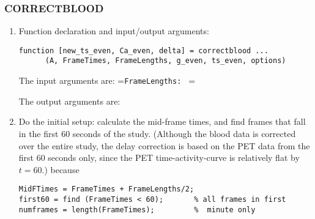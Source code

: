 \subsubsection{CORRECTBLOOD}
\label{sec:correctblood_listing}

\begin{enumerate}

\item Function declaration and input/output arguments:
  \begin{verbatim}
function [new_ts_even, Ca_even, delta] = correctblood ...
      (A, FrameTimes, FrameLengths, g_even, ts_even, options)
  \end{verbatim}
The input arguments are:
%
\newbox\holder
\setbox\holder=\hbox{\tt FrameLengths: }
=\wd\holder
%
The output arguments are:


\item Do the initial setup: calculate the mid-frame times, and find
  frames that fall in the first 60 seconds of the study.  (Although
  the blood data is corrected over the entire study, the delay
  correction is based on the PET data from the first 60 seconds only,
  since the PET time-activity-curve is relatively flat by $t=60$.)
  because
\begin{verbatim}
MidFTimes = FrameTimes + FrameLengths/2;
first60 = find (FrameTimes < 60);       % all frames in first
numframes = length(FrameTimes);         %  minute only
\end{verbatim}


\end{enumerate}
